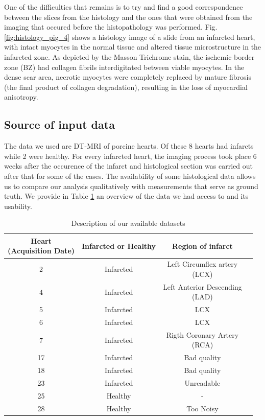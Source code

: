 One of the difficulties that remains is to try and find a good correspondence between the slices from the histology and the ones that were obtained from the imaging that occured before the histopathology was performed. Fig. \ref{fig:histology_pig_4} shows a histology image of a slide from an infarcted heart, with intact myocytes in the normal tissue and altered tissue microstructure in the infarcted zone. As depicted by the Masson Trichrome stain, the ischemic border zone (BZ) had collagen fibrils interdigitated between viable myocytes. In the dense scar area, necrotic myocytes were completely replaced by mature fibrosis (the final product of collagen degradation), resulting in the loss of myocardial anisotropy.

\subsection{Source of input data}

The data we used \cite{pmbpop2013quantification} are DT-MRI of porcine hearts. Of these 8 hearts had infarcts while 2 were healthy. For every infarcted heart, the imaging process took place 6 weeks after the occurence of the infarct and histological section was carried out after that for some of the cases. The availability of some histological data allows us to compare our analysis qualitatively with measurements that serve as ground truth. We provide  in Table \ref{tab:hearts} an overview of the data we had access to and its usability.

\begin{table}
    \centering
    \begin{tabular}{|c | c | c | c|} 
         \hline
         \shortstack{Heart \\ (Acquisition Date)} & Infarcted or Healthy & Region of infarct \\
         \hline
         2 & Infarcted & \shortstack{Left Circumflex artery \\ (LCX)} \\ 
         \hline
         4 & Infarcted & \shortstack{Left Anterior Descending \\ (LAD)} \\
         \hline
         5 & Infarcted & LCX \\
         \hline
         6 & Infarcted & LCX \\
         \hline
         7 & Infarcted & \shortstack{Rigth Coronary Artery \\ (RCA)} \\ 
         \hline
         17 & Infarcted & Bad quality \\
         \hline
         18 & Infarcted & Bad quality \\
         \hline
         23 & Infarcted & Unreadable \\
         \hline
         25 & Healthy & - \\
         \hline
         28 & Healthy & Too Noisy \\
         \hline
    \end{tabular}
    \caption{Description of our available datasets}
    \label{tab:hearts}
\end{table}

